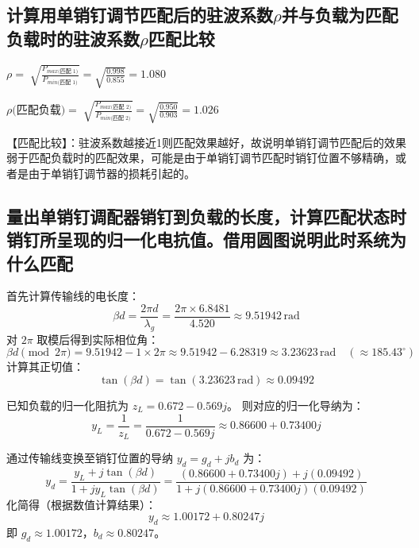\documentclass[12pt,a4paper,UTF8]{article}
\begin{document}
    \subsection{计算用单销钉调节匹配后的驻波系数$\rho$并与负载为匹配负载时的驻波系数$\rho$匹配比较}
    
    $\rho=\sqrt[]{\frac{P_{max\text{(匹配 1)}}}{P_{min\text{(匹配 1)}}}}=\sqrt{\frac{0.998}{0.855}}=1.080$

    $\rho\text{(匹配负载)}=\sqrt[]{\frac{P_{max\text{(匹配 2)}}}{P_{min\text{(匹配 2)}}}}=\sqrt{\frac{0.950}{0.903}}=1.026$

    
    【匹配比较】：驻波系数越接近1则匹配效果越好，故说明单销钉调节匹配后的效果弱于匹配负载时的匹配效果，可能是由于单销钉调节匹配时销钉位置不够精确，或者是由于单销钉调节器的损耗引起的。
\subsection{量出单销钉调配器销钉到负载的长度，计算匹配状态时销钉所呈现的归一化电抗值。借用圆图说明此时系统为什么匹配}
首先计算传输线的电长度：
\begin{equation}
    \beta d = \frac{2\pi d}{\lambda_g} = \frac{2\pi \times 6.8481}{4.520} \approx 9.51942 \, \text{rad}
\end{equation}
对 $2\pi$ 取模后得到实际相位角：
\begin{equation}
    \beta d \pmod{2\pi} = 9.51942 - 1 \times 2\pi \approx 9.51942 - 6.28319 \approx 3.23623 \, \text{rad} \quad (\approx 185.43^\circ)
\end{equation}
计算其正切值：
\begin{equation}
    \tan(\beta d) = \tan(3.23623 \, \text{rad}) \approx 0.09492
\end{equation}

已知负载的归一化阻抗为 $z_L = 0.672 - 0.569j$。
则对应的归一化导纳为：
\begin{equation}
    y_L = \frac{1}{z_L} = \frac{1}{0.672 - 0.569j} \approx 0.86600 + 0.73400j
\end{equation}

通过传输线变换至销钉位置的导纳 $y_d = g_d + jb_d$ 为：
\begin{equation}
    y_d = \frac{y_L + j\tan(\beta d)}{1 + j y_L \tan(\beta d)} = \frac{(0.86600 + 0.73400j) + j(0.09492)}{1 + j(0.86600 + 0.73400j)(0.09492)}
\end{equation}
化简得（根据数值计算结果）：
\begin{equation}
    y_d \approx 1.00172 + 0.80247j
\end{equation}
即 $g_d \approx 1.00172$，$b_d \approx 0.80247$。
\end{document}
